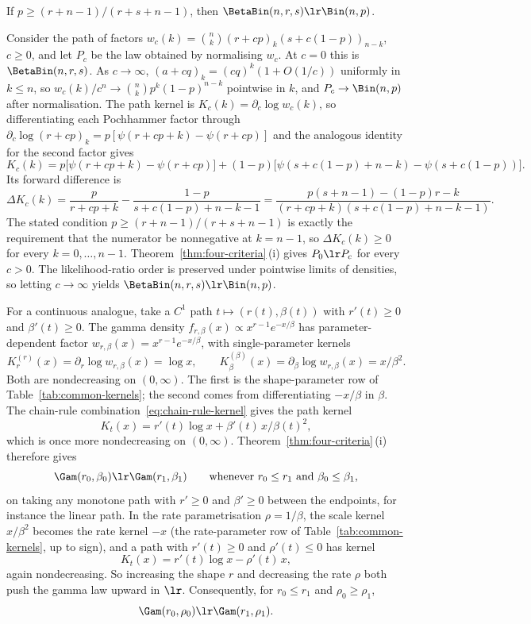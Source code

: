 \documentclass[11pt]{article}
\begin{document}
\begin{example}
\label{ex:bb-bin}
If $p\ge (r+n-1)/(r+s+n-1)$, then $\BetaBin(n,r,s)\lr \Bin(n,p)$.

Consider the path of factors \(w_c(k)=\binom{n}{k}(r+cp)_k(s+c(1-p))_{n-k}\), \(c\ge 0\), and let \(P_c\) be the law obtained by normalising \(w_c\). At \(c=0\) this is \(\BetaBin(n,r,s)\). As \(c\to\infty\), \((a+cq)_k=(cq)^k(1+O(1/c))\) uniformly in \(k\le n\), so \(w_c(k)/c^n\to\binom{n}{k}p^k(1-p)^{n-k}\) pointwise in \(k\), and \(P_c\to\Bin(n,p)\) after normalisation. The path kernel is \(K_c(k)=\partial_c\log w_c(k)\), so differentiating each Pochhammer factor through \(\partial_c\log(r+cp)_k=p[\psi(r+cp+k)-\psi(r+cp)]\) and the analogous identity for the second factor gives
\[
K_c(k)=p\bigl[\psi(r+cp+k)-\psi(r+cp)\bigr]+(1-p)\bigl[\psi(s+c(1-p)+n-k)-\psi(s+c(1-p))\bigr].
\]
Its forward difference is
\[
\Delta K_c(k)
=\frac{p}{r+cp+k}-\frac{1-p}{s+c(1-p)+n-k-1}
=\frac{p(s+n-1)-(1-p)r-k}{(r+cp+k)(s+c(1-p)+n-k-1)}.
\]
The stated condition \(p\ge(r+n-1)/(r+s+n-1)\) is exactly the requirement that the numerator be nonnegative at \(k=n-1\), so \(\Delta K_c(k)\ge 0\) for every \(k=0,\dots,n-1\). Theorem~\ref{thm:four-criteria}\,\textup{(i)} gives \(P_0\lr P_c\) for every \(c>0\). The likelihood-ratio order is preserved under pointwise limits of densities, so letting \(c\to\infty\) yields \(\BetaBin(n,r,s)\lr\Bin(n,p)\).
\end{example}

\begin{example}
\label{ex:gamma-path}
For a continuous analogue, take a \(C^1\) path \(t\mapsto(r(t),\beta(t))\) with \(r'(t)\ge 0\) and \(\beta'(t)\ge 0\). The gamma density \(f_{r,\beta}(x)\propto x^{r-1}e^{-x/\beta}\) has parameter-dependent factor \(w_{r,\beta}(x)=x^{r-1}e^{-x/\beta}\), with single-parameter kernels
\[
K^{(r)}_{r}(x)=\partial_r\log w_{r,\beta}(x)=\log x,
\qquad
K^{(\beta)}_{\beta}(x)=\partial_\beta\log w_{r,\beta}(x)=x/\beta^2.
\]
Both are nondecreasing on \((0,\infty)\). The first is the shape-parameter row of Table~\ref{tab:common-kernels}; the second comes from differentiating \(-x/\beta\) in \(\beta\). The chain-rule combination~\eqref{eq:chain-rule-kernel} gives the path kernel
\[
K_t(x)=r'(t)\log x+\beta'(t)\,x/\beta(t)^2,
\]
which is once more nondecreasing on \((0,\infty)\). Theorem~\ref{thm:four-criteria}\,\textup{(i)} therefore gives
\[
\Gam(r_0,\beta_0)\lr\Gam(r_1,\beta_1) \qquad\text{whenever } r_0\le r_1 \text{ and } \beta_0\le\beta_1,
\]
on taking any monotone path with \(r'\ge0\) and \(\beta'\ge0\) between the endpoints, for instance the linear path. In the rate parametrisation \(\rho=1/\beta\), the scale kernel \(x/\beta^2\) becomes the rate kernel \(-x\) (the rate-parameter row of Table~\ref{tab:common-kernels}, up to sign), and a path with \(r'(t)\ge0\) and \(\rho'(t)\le0\) has kernel
\[
K_t(x)=r'(t)\log x-\rho'(t)\,x,
\]
again nondecreasing. So increasing the shape \(r\) and decreasing the rate \(\rho\) both push the gamma law upward in \(\lr\). Consequently, for \(r_0\le r_1\) and \(\rho_0\ge\rho_1\),
\[
\Gam(r_0,\rho_0)\lr\Gam(r_1,\rho_1).
\]

\end{example}
\end{document}
